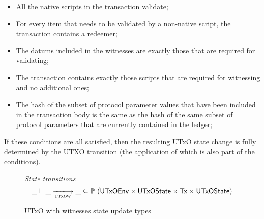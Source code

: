\begin{itemize}

\item All the native scripts in the transaction validate;

  \item For every item that needs to be validated by a non-native script, the transaction contains
    a redeemer;

    \item The datums included in the witnesses are exactly those that are required for validating;

    \item The transaction contains exactly those scripts that are required for witnessing and no
    additional ones;

    \item
    The hash of the subset of protocol parameter values that have been included in the transaction body is the same as
    the hash of the same subset of protocol parameters that are currently contained in the ledger;

\end{itemize}

If these conditions are all satisfied, then the resulting UTxO state change is fully determined
by the UTXO transition (the application of which is also part of the conditions).

\begin{figure}[htb]
  \emph{State transitions}
  \begin{equation*}
    \_ \vdash
    \var{\_} \trans{utxow}{\_} \var{\_}
    \subseteq \powerset (\UTxOEnv \times \UTxOState \times \Tx \times \UTxOState)
  \end{equation*}
  \caption{UTxO with witnesses state update types}
  \label{fig:ts-types:utxo-witness}
\end{figure}

